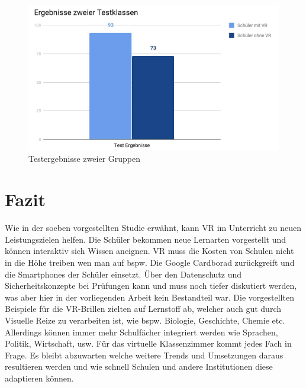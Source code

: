\begin{figure}[ht]
	\centering
	\includegraphics[width=\textwidth,height=\textheight,keepaspectratio]{images/Testergebnisse zweier Gruppen.png}
	\caption{Testergebnisse zweier Gruppen}
	\label{Testergebnisse zweier Gruppen}
\end{figure}

\section{Fazit}
Wie in der soeben vorgestellten Studie erwähnt, kann VR im Unterricht zu neuen Leistungszielen helfen. Die Schüler bekommen neue Lernarten vorgestellt und können interaktiv sich Wissen aneignen. VR muss die Kosten von Schulen nicht in die Höhe treiben wen man auf bspw. Die Google Cardborad zurückgreift und die Smartphones der Schüler einsetzt. Über den Datenschutz und Sicherheitskonzepte bei Prüfungen kann und muss noch tiefer diskutiert werden, was aber hier in der vorliegenden Arbeit kein Bestandteil war. Die vorgestellten Beispiele für die VR-Brillen zielten auf Lernstoff ab, welcher auch gut durch Visuelle Reize zu verarbeiten ist, wie bspw. Biologie, Geschichte, Chemie etc. Allerdings können immer mehr Schulfächer integriert werden wie Sprachen, Politik, Wirtschaft, usw. Für das virtuelle Klassenzimmer kommt jedes Fach in Frage. 
Es bleibt abzuwarten welche weitere Trends und Umsetzungen daraus resultieren werden und wie schnell Schulen und andere Institutionen diese adaptieren können. 